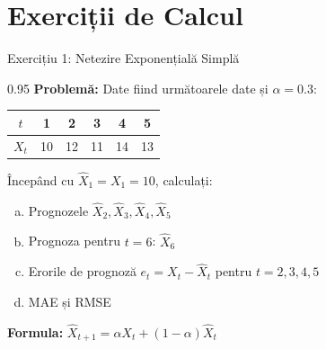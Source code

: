\documentclass[9pt, aspectratio=169, t]{beamer}
\begin{document}
\section{Exerciții de Calcul}

\begin{frame}{Exercițiu 1: Netezire Exponențială Simplă}
    \begin{cminipage}{0.95\textwidth}
    \textbf{Problemă:} Date fiind următoarele date și $\alpha = 0.3$:

    \begin{center}
    \begin{tabular}{c|ccccc}
        $t$ & 1 & 2 & 3 & 4 & 5 \\
        \hline
        $X_t$ & 10 & 12 & 11 & 14 & 13 \\
    \end{tabular}
    \end{center}

    Începând cu $\hat{X}_1 = X_1 = 10$, calculați:

    \vspace{0.3cm}

    \begin{enumerate}[a)]\setlength{\itemsep}{0pt}
        \item Prognozele $\hat{X}_2, \hat{X}_3, \hat{X}_4, \hat{X}_5$
        \item Prognoza pentru $t = 6$: $\hat{X}_6$
        \item Erorile de prognoză $e_t = X_t - \hat{X}_t$ pentru $t = 2, 3, 4, 5$
        \item MAE și RMSE
    \end{enumerate}

    \vspace{0.3cm}

    \textbf{Formula:} $\hat{X}_{t+1} = \alpha X_t + (1-\alpha)\hat{X}_t$
    \end{cminipage}
\end{frame}
\end{document}

